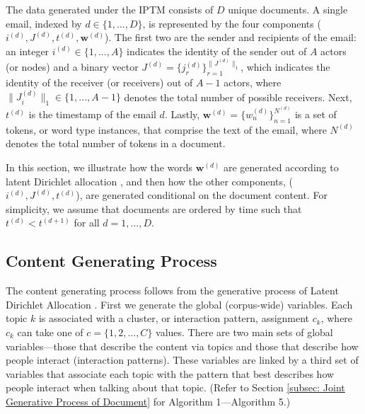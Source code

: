 \documentclass[a4paper]{article}
\begin{document}
The data generated under the IPTM consists of $D$ unique documents. A single email, indexed by $d \in \{1,...,D\}$, is represented by the four components ($i^{(d)}, J^{(d)}, t^{(d)},  \boldsymbol{w}^{(d)}$). The first two are the sender and recipients of the email: an integer $i^{(d)} \in \{1,...,A\}$ indicates the identity of the sender out of $A$ actors (or nodes) and a binary vector $J^{(d)} = \{j_r^{(d)}\}_{r=1}^{\lVert J^{(d)} \rVert_1} $, which indicates the identity of the receiver (or receivers) out of $A-1$ actors, where $\lVert J_{i}^{(d)} \rVert_1\in \{1,...,A-1\}$ denotes the total number of possible receivers. Next, $t^{(d)}$ is the timestamp of the email $d$. Lastly, $\boldsymbol{w}^{(d)} = \{w^{(d)}_n \}_{n=1}^{N^{(d)}}$ is a set of tokens, or word type instances, that comprise the text of the email, where $N^{(d)}$ denotes the total number of tokens in a document. 

In this section, we illustrate how the words $\boldsymbol{w}^{(d)}$ are generated according to latent Dirichlet allocation \citep{Blei2003}, and then how the other components, ($i^{(d)}, J^{(d)}, t^{(d)}$), are generated conditional on the document content. For simplicity, we assume that documents are ordered by time such that $t^{(d)} < t^{(d+1)}$ for all $d=1, ..., D$. 
\subsection{Content Generating Process} \label{subsec: Content Generating Process} 
The content generating process follows from the generative process of Latent Dirichlet Allocation \cite{Blei2003}. First we generate the global (corpus-wide) variables. Each topic $k$ is associated with a cluster, or interaction pattern, assignment $c_k$, where $c_k$ can take one of $c = \{1,2,...,C\}$ values.  There are two main sets of global variables---those that describe the content via topics and those that describe how people interact (interaction patterns). These variables are linked by a third set of variables that associate each topic with the pattern that best describes how people interact when talking about that topic. (Refer to Section \ref{subsec: Joint Generative Process of Document} for Algorithm 1---Algorithm 5.)
\end{document}
